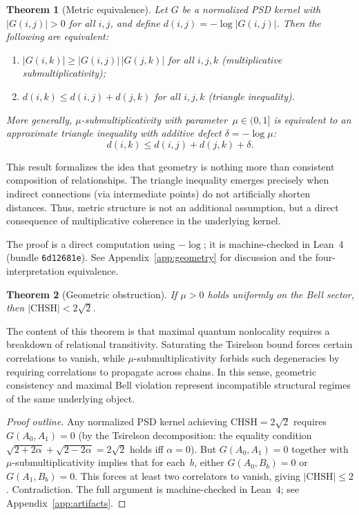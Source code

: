 \documentclass[11pt,a4paper]{article}
\newtheorem{theorem}{Theorem}[section]
\theoremstyle{definition}
\theoremstyle{remark}
\newcommand{\CHSH}{\mathrm{CHSH}}
\begin{document}
\begin{theorem}[Metric equivalence]\label{thm:equiv}
Let $G$ be a normalized PSD kernel with $|G(i,j)| > 0$ for all $i,j$, and define $d(i,j) = -\log|G(i,j)|$. Then the following are equivalent:
\begin{enumerate}[nosep]
  \item $|G(i,k)| \ge |G(i,j)|\,|G(j,k)|$ for all $i,j,k$ \emph{(multiplicative submultiplicativity)};
  \item $d(i,k) \le d(i,j) + d(j,k)$ for all $i,j,k$ \emph{(triangle inequality)}.
\end{enumerate}
More generally, $\mu$-submultiplicativity with parameter~$\mu \in (0,1]$ is equivalent to an approximate triangle inequality with additive defect $\delta = -\log\mu$:
\[
d(i,k) \le d(i,j) + d(j,k) + \delta.
\]
\end{theorem}

This result formalizes the idea that geometry is nothing more than consistent composition of relationships. The triangle inequality emerges precisely when indirect connections (via intermediate points) do not artificially shorten distances. Thus, metric structure is not an additional assumption, but a direct consequence of multiplicative coherence in the underlying kernel.

The proof is a direct computation using $-\log$; it is machine-checked in Lean~4 (bundle \texttt{6d12681e}). See Appendix~\ref{app:geometry} for discussion and the four-interpretation equivalence.

\begin{theorem}[Geometric obstruction]\label{thm:obstruction}
If $\mu > 0$ holds uniformly on the Bell sector, then $|\CHSH| < 2\sqrt{2}$.
\end{theorem}

The content of this theorem is that maximal quantum nonlocality requires a breakdown of relational transitivity. Saturating the Tsirelson bound forces certain correlations to vanish, while $\mu$-submultiplicativity forbids such degeneracies by requiring correlations to propagate across chains. In this sense, geometric consistency and maximal Bell violation represent incompatible structural regimes of the same underlying object.

\begin{proof}[Proof outline]
Any normalized PSD kernel achieving $\CHSH = 2\sqrt{2}$ requires $G(A_0,A_1) = 0$ (by the Tsirelson decomposition: the equality condition $\sqrt{2+2\alpha} + \sqrt{2-2\alpha} = 2\sqrt{2}$ holds iff $\alpha = 0$). But $G(A_0,A_1) = 0$ together with $\mu$-submultiplicativity implies that for each~$b$, either $G(A_0,B_b) = 0$ or $G(A_1,B_b) = 0$. This forces at least two correlators to vanish, giving $|\CHSH| \le 2$. Contradiction. The full argument is machine-checked in Lean~4; see Appendix~\ref{app:artifacts}.
\end{proof}
\end{document}
